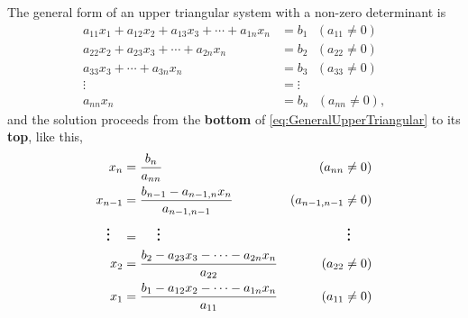 The general form of an upper triangular system with a non-zero determinant is
\begin{equation}
\label{eq:GeneralUpperTriangular}
    \begin{aligned}
     a_{11} x_1 + a_{12} x_2 + a_{13} x_3+ \cdots +  a_{1n} x_n &=b_1 ~~~(a_{11} \neq 0)\\
     a_{22} x_2 + a_{23} x_3 + \cdots +  a_{2n} x_n &=b_2 ~~~(a_{22} \neq 0)\\
       a_{33} x_3 + \cdots +  a_{3n} x_n &=b_3 ~~~(a_{33} \neq 0)\\
     \vdots &= \vdots \\
     a_{nn} x_n &= b_n  ~~~(a_{nn} \neq 0),
    \end{aligned}
\end{equation}
and the solution proceeds from the \textbf{bottom} of \eqref{eq:GeneralUpperTriangular} to its \textbf{top}, like this,
\begin{equation}
    \begin{aligned}
    x_n &= \frac{b_n}{a_{nn}}  &(a_{nn} \neq 0) \medskip \\
     x_{n-1}  &= \frac{b_{n-1}- a_{n-1,n} x_n}{a_{n-1,n-1}}  &(a_{n-1,n-1} \neq 0)\\
       \boldmath \vdots \unboldmath~~~ &=~~~~  \boldmath \vdots \unboldmath &  \boldmath \vdots \unboldmath~~~~~ \\
        x_2 &= \frac{b_2-  a_{23} x_3 - \cdots -  a_{2n} x_n}{a_{22}} &(a_{22} \neq 0)\\
      x_1  &=\frac{b_1- a_{12} x_2 - \cdots -  a_{1n} x_n}{a_{11}} &(a_{11} \neq 0)
    \end{aligned}
\end{equation}


